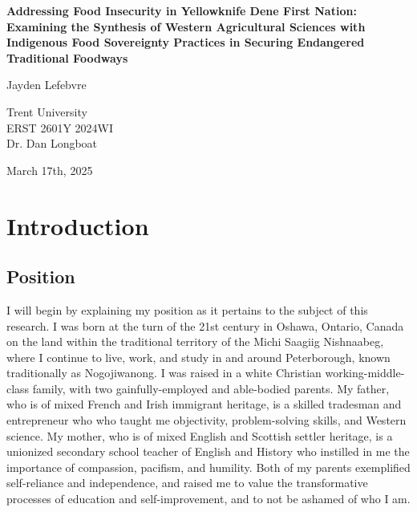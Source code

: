 \documentclass{report}
\begin{document}
\begin{titlepage}
    \begin{center}
        \vspace*{1.2cm}

        \textbf{Addressing Food Insecurity in Yellowknife Dene First Nation: Examining the Synthesis of Western Agricultural Sciences with Indigenous Food Sovereignty Practices in Securing Endangered Traditional Foodways}

        \vspace{2cm}

        Jayden Lefebvre\\

        \vspace{5cm}
        
        Trent University\\
        ERST 2601Y 2024WI\\
        Dr. Dan Longboat\\

        \vfill

        March 17th, 2025
        
    \end{center}
\end{titlepage}

\thispagestyle{plain}
\tableofcontents

\clearpage

\section{Introduction}

\subsection{Position}

\hspace{24pt} I will begin by explaining my position as it pertains to the subject of this research.
I was born at the turn of the 21st century in Oshawa, Ontario, Canada on the land within the traditional territory of the Michi Saagiig Nishnaabeg, where I continue to live, work, and study in and around Peterborough, known traditionally as Nogojiwanong.
I was raised in a white Christian working-middle-class family, with two gainfully-employed and able-bodied parents.
My father, who is of mixed French and Irish immigrant heritage, is a skilled tradesman and entrepreneur who who taught me objectivity, problem-solving skills, and Western science.
My mother, who is of mixed English and Scottish settler heritage, is a unionized secondary school teacher of English and History who instilled in me the importance of compassion, pacifism, and humility.
Both of my parents exemplified self-reliance and independence, and raised me to value the transformative processes of education and self-improvement, and to not be ashamed of who I am.
\end{document}
